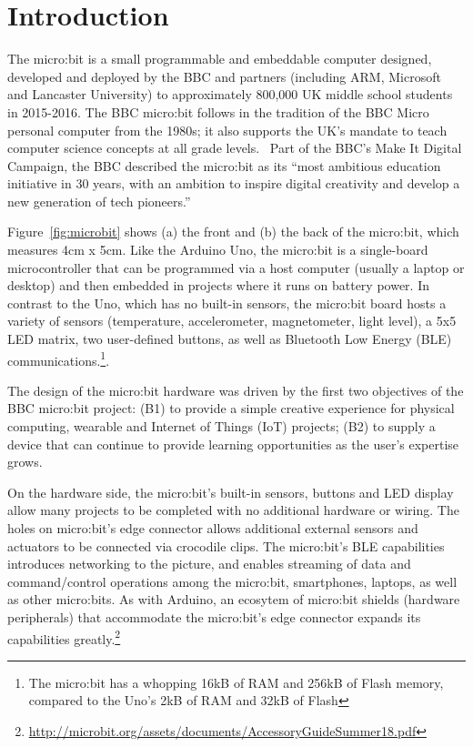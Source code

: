 \section{Introduction}
\label{sec:intrp}


The micro:bit is a small programmable and embeddable computer designed, 
developed and deployed by the BBC and partners (including ARM, Microsoft
and Lancaster University) to approximately 800,000 UK middle school students
in 2015-2016. The BBC micro:bit follows in the tradition of the BBC Micro personal
computer from the 1980s; it also supports the UK's mandate to 
teach computer science concepts at all grade levels.~\cite{SimonPJ}
Part of the BBC's Make It Digital Campaign, the BBC described the
micro:bit as its ``most ambitious education initiative in 30 years, 
with an ambition to inspire digital creativity and 
develop a new generation of tech pioneers.''~\cite{BBCwebsite}


Figure~\ref{fig:microbit} shows (a) the front and (b) the back of the
micro:bit, which measures 4cm x 5cm. Like the Arduino Uno, 
the micro:bit is a single-board microcontroller 
that can be programmed via a host computer (usually a laptop or desktop)
and then embedded in projects where it runs on battery power.
In contrast to the Uno, which has no built-in sensors, the micro:bit 
board hosts a variety of sensors (temperature, accelerometer, magnetometer, 
light level), 
a 5x5 LED matrix, two user-defined buttons, as well as Bluetooth
Low Energy (BLE) communications.\footnote{The micro:bit has a whopping
16kB of RAM and 256kB of Flash memory, compared to the Uno's 2kB of 
RAM and 32kB of Flash}.

The design of the micro:bit hardware was driven by the
first two objectives of the BBC micro:bit project:
(B1) to provide a simple creative experience for physical computing, wearable and Internet of Things (IoT) projects;
(B2) to supply a device that can continue to provide learning opportunities as the user's expertise grows.

On the hardware side, the micro:bit's built-in sensors, buttons and LED display 
allow many projects to be completed with no additional hardware or wiring. 
The holes on micro:bit's edge
connector allows additional external sensors and actuators to be connected via crocodile clips.
The micro:bit's BLE capabilities introduces networking to the
picture, and enables streaming of data and command/control operations among the micro:bit, 
smartphones, laptops, as well as other micro:bits.
As with Arduino, an ecosytem of micro:bit shields
(hardware peripherals) that accommodate the micro:bit's edge
connector expands its capabilities greatly.\footnote{
\url{http://microbit.org/assets/documents/AccessoryGuideSummer18.pdf}
}

